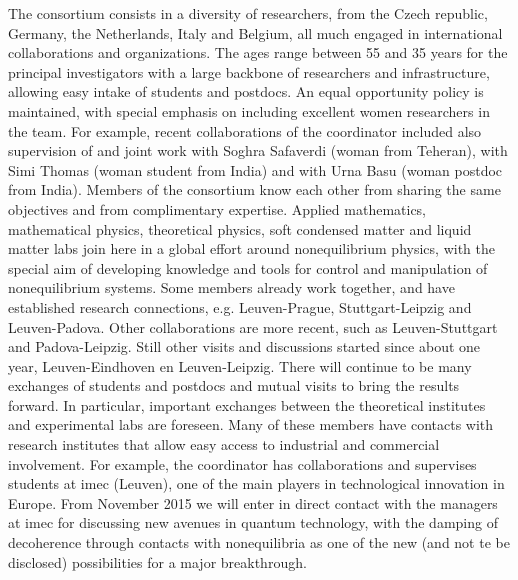 The consortium consists in a diversity of researchers, from the Czech republic, Germany, the
Netherlands, Italy and Belgium, all much engaged in international collaborations and
organizations.
%
The ages range between 55 and 35 years for the principal investigators with a large backbone
of researchers and infrastructure, allowing easy intake of students and postdocs. An equal
opportunity policy is maintained, with special emphasis on including excellent women
researchers in the team. For example, recent collaborations of the coordinator included also
supervision of and joint work with Soghra Safaverdi (woman from Teheran), with Simi Thomas
(woman student from India) and with Urna Basu (woman postdoc from India).  Members of the
consortium know each other from sharing the same objectives and from complimentary
expertise.
%
Applied mathematics, mathematical physics, theoretical physics, soft condensed matter and
liquid matter labs join here in a global effort around nonequilibrium physics, with the
special aim of developing knowledge and tools for control and manipulation of nonequilibrium
systems. Some members already work together, and have established research connections,
e.g. Leuven-Prague, Stuttgart-Leipzig and Leuven-Padova.  Other collaborations are more
recent, such as Leuven-Stuttgart and Padova-Leipzig.  Still other visits and discussions
started since about one year, Leuven-Eindhoven en Leuven-Leipzig.
%
There will continue to be many exchanges of students and postdocs and mutual visits to bring
the results forward.  In particular, important exchanges between the theoretical institutes
and experimental labs are foreseen.  Many of these members have contacts with research
institutes that allow easy access to industrial and commercial involvement.  For example,
the coordinator has collaborations and supervises students at imec (Leuven), one of the main
players in technological innovation in Europe. From November 2015 we will enter in direct
contact with the managers at imec for discussing new avenues in quantum technology, with the
damping of decoherence through contacts with nonequilibria as one of the new (and not te be
disclosed) possibilities for a major breakthrough.


